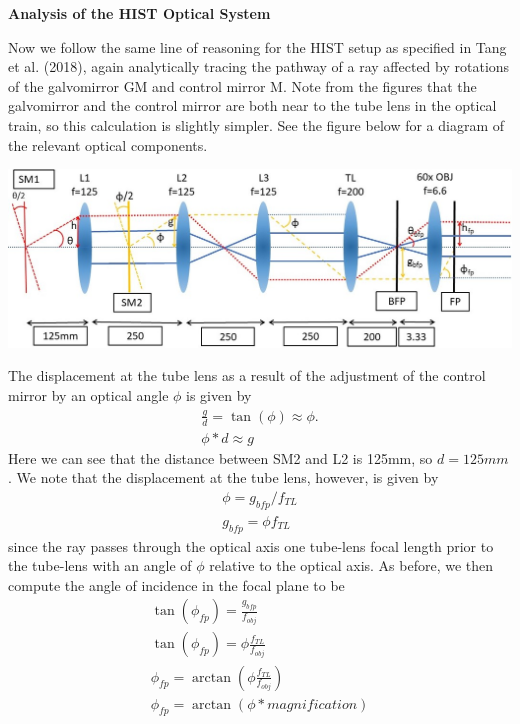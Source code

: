 \newpage
\begin{center}
    \textbf{Analysis of the HIST Optical System } 
\end{center}
Now we follow the same line of reasoning for the HIST setup as specified in Tang et al. (2018), again analytically tracing the pathway of a ray affected by rotations of the galvomirror GM and control mirror M. Note from the figures that the galvomirror and the control mirror are both near to the tube lens in the optical train, so this calculation is slightly simpler. See the figure below for a diagram of the relevant optical components.
\begin{center}
    \includegraphics[width=\textwidth]{Hestia_HIST_Computation_Fig2.jpg}
\end{center}
The displacement at the tube lens as a result of the adjustment of the control mirror by an optical angle $\phi$ is given by
\begin{gather}
    \frac{g}{d} = \tan(\phi) \approx \phi.\\
    \phi*d \approx g
\end{gather}
Here we can see that the distance between SM2 and L2 is 125mm, so $d=125mm$. We note that the displacement at the tube lens, however, is given by
\begin{gather}
    \phi = g_{bfp}/f_{TL}\\
    g_{bfp} = \phi f_{TL}
\end{gather}
since the ray passes through the optical axis one tube-lens focal length prior to the tube-lens with an angle of $\phi$ relative to the optical axis. As before, we then compute the angle of incidence in the focal plane to be
\begin{gather}
    \tan(\phi_{fp}) = \frac{g_{bfp}}{f_{obj}}\\
    \tan(\phi_{fp}) = \phi \frac{f_{TL}}{f_{obj}}\\
    \phi_{fp} = \arctan(\phi \frac{f_{TL}} {f_{obj}})\\
    \phi_{fp} = \arctan(\phi * magnification)
\end{gather}
